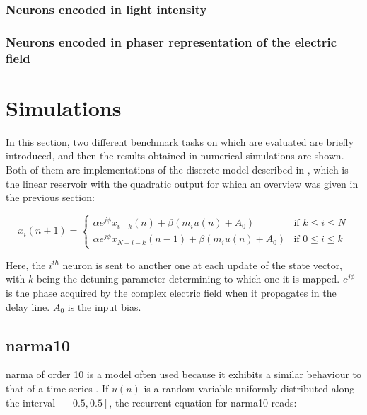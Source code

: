 \subsubsection{Neurons encoded in light intensity}


\subsubsection{Neurons encoded in phaser representation of the electric field}

\section{Simulations}

In this section, two different benchmark tasks on which \rcer are evaluated are briefly introduced, and then the results obtained in numerical simulations are shown. Both of them are implementations of the discrete model described in \cite{Vinckier2015}, which is the linear reservoir with the quadratic output for which an overview was given in the previous section:

\begin{equation}
	x_i(n+1) = 
	\begin{cases}
		\alpha e^{j\phi} x_{i-k}(n)+\beta \left(m_i u(n) +A_0 \right) & \text{if } k \leq i \leq N\\
		\alpha e^{j\phi} x_{N+i-k}(n-1)+\beta \left(m_i u(n) +A_0 \right) & \text{if } 0 \leq i \leq k			
	\end{cases}
\end{equation}

Here, the $i^{th}$ neuron is sent to another one at each update of the state vector, with $k$ being the detuning parameter determining to which one it is mapped. $e^{j\phi}$ is the phase acquired by the complex electric field when it propagates in the delay line. $A_0$ is the input bias.

\subsection{\gls{narma}10}

\acrlong{narma} of order 10 is a model often used because it exhibits a similar behaviour to that of a time series \cite{Paquot2012}. If $u(n)$ is a random variable uniformly distributed along the interval $[-0.5, 0.5]$, the recurrent equation for \gls{narma}10 reads:

